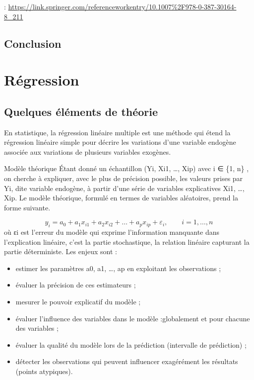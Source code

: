 \documentclass[
]{book}
\providecommand{\tightlist}{%
  \setlength{\itemsep}{0pt}\setlength{\parskip}{0pt}}
\begin{document}
: \url{https://link.springer.com/referenceworkentry/10.1007\%2F978-0-387-30164-8_211}

\hypertarget{conclusion-1}{%
\section{Conclusion}\label{conclusion-1}}

\hypertarget{ruxe9gression}{%
\chapter{Régression}\label{ruxe9gression}}

\hypertarget{quelques-uxe9luxe9ments-de-thuxe9orie}{%
\section{Quelques éléments de théorie}\label{quelques-uxe9luxe9ments-de-thuxe9orie}}

En statistique, la régression linéaire multiple est une méthode qui étend la régression linéaire simple pour décrire les variations d'une variable endogène associée aux variations de plusieurs variables exogènes.

Modèle théorique
Étant donné un échantillon (Yi, Xi1, \ldots, Xip) avec i ∈ \{1, n\} , on cherche à expliquer, avec le plus de précision possible, les valeurs prises par Yi, dite variable endogène, à partir d'une série de variables explicatives Xi1, \ldots, Xip. Le modèle théorique, formulé en termes de variables aléatoires, prend la forme suivante.

\[{y_{i}=a_{0}+a_{1}x_{i1}+a_{2}x_{i2}+\ldots +a_{p}x_{ip}+\varepsilon _{i},\qquad i=1,\ldots,n}\]
où εi est l'erreur du modèle qui exprime l'information manquante dans l'explication linéaire, c'est la partie stochastique, la relation linéaire capturant la partie déterministe. Les enjeux sont :

\begin{itemize}
\tightlist
\item
  estimer les paramètres a0, a1, \ldots, ap en exploitant les observations ;
\item
  évaluer la précision de ces estimateurs ;
\item
  mesurer le pouvoir explicatif du modèle ;
\item
  évaluer l'influence des variables dans le modèle :globalement et pour chacune des variables ;
\item
  évaluer la qualité du modèle lors de la prédiction (intervalle de prédiction) ;
\item
  détecter les observations qui peuvent influencer exagérément les résultats (points atypiques).
\end{itemize}
\end{document}
